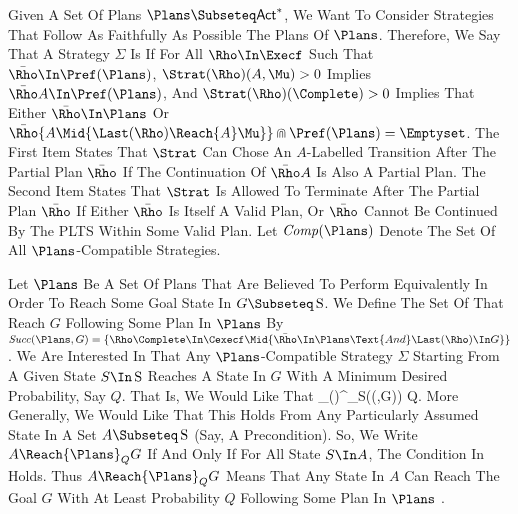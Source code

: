 



Given A Set Of Plans $\Plans\Subseteq\ACT^*$, We Want To Consider
Strategies That Follow As Faithfully As Possible The Plans Of
$\Plans$.  Therefore, We Say That A Strategy $\Sigma$ Is
 If For All $\Rho\In\Execf$ Such That
$\Bar{\Rho}\In\Pref(\Plans)$,
%
\Item%
  $\Strat(\Rho)(A,\Mu)>0$ Implies $\Bar{\Rho}A\In\Pref(\Plans)$, And
\Item%
  $\Strat(\Rho)(\Complete)>0$ Implies That Either
  $\Bar{\Rho}\In\Plans$ Or
  $\Bar{\Rho}\{A\Mid{\Last(\Rho)\Reach{A}\Mu}\}\Cap\Pref(\Plans) = \Emptyset$. 
%
The First Item States That $\Strat$ Can Chose An $A$-Labelled
Transition After The Partial Plan $\Bar{\Rho}$ If The Continuation Of
$\Bar{\Rho}A$ Is Also A Partial Plan.
%
The Second Item States That $\Strat$ Is Allowed To Terminate After The
Partial Plan $\Bar{\Rho}$ If Either $\Bar{\Rho}$ Is Itself A Valid
Plan, Or $\Bar{\Rho}$ Cannot Be Continued By The PLTS Within Some
Valid Plan.
%
Let $\Comp(\Plans)$ Denote The Set Of All $\Plans$-Compatible
Strategies.
%


Let $\Plans$ Be A Set Of Plans That Are Believed To Perform
Equivalently In Order To Reach Some Goal State In $G\Subseteq\S$.  We
Define The Set Of  That
Reach $G$ Following Some Plan In $\Plans$ By
$\Succ(\Plans,G)=\{{\Rho\Complete\In\Cexecf}\Mid{\Bar{\Rho}\In\Plans
  \Text{ And } \Last(\Rho)\In G}\}$.
%
We Are Interested In That Any $\Plans$-Compatible Strategy $\Sigma$
Starting From A Given State $S\In\S$ Reaches A State In $G$ With A
Minimum Desired Probability, Say $Q$.  That Is, We Would Like That
%
  \Inf_{\Sigma \In\Comp(\Plans)}\Prob^\Strat_S(\Succ(\Plans,G)) \Geq Q.
%
More Generally, We Would Like That This Holds From Any Particularly
Assumed State In A Set $A\Subseteq\S$ (Say, A Precondition).  So, We
Write $A \Reach{\Plans}_Q G$ If And Only If For All State $S\In A$,
The Condition In  Holds.
%
Thus $A \Reach{\Plans}_Q G$ Means That Any State In $A$ Can Reach The
Goal $G$ With At Least Probability $Q$ Following Some Plan In $\Plans$
.


